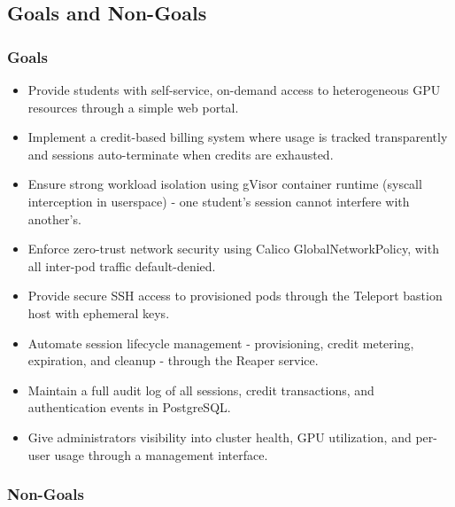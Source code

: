 \documentclass[12pt,a4paper]{article}
\begin{document}
\subsection{Goals and Non-Goals}

\subsubsection*{Goals}

\begin{itemize}[leftmargin=1.5em]
  \item Provide students with self-service, on-demand access to heterogeneous GPU resources through a simple web portal.
  \item Implement a credit-based billing system where usage is tracked transparently and sessions auto-terminate when credits are exhausted.
  \item Ensure strong workload isolation using gVisor container runtime (syscall interception in userspace) - one student's session cannot interfere with another's.
  \item Enforce zero-trust network security using Calico GlobalNetworkPolicy, with all inter-pod traffic default-denied.
  \item Provide secure SSH access to provisioned pods through the Teleport bastion host with ephemeral keys.
  \item Automate session lifecycle management - provisioning, credit metering, expiration, and cleanup - through the Reaper service.
  \item Maintain a full audit log of all sessions, credit transactions, and authentication events in PostgreSQL.
  \item Give administrators visibility into cluster health, GPU utilization, and per-user usage through a management interface.
\end{itemize}

\subsubsection*{Non-Goals}
\end{document}
